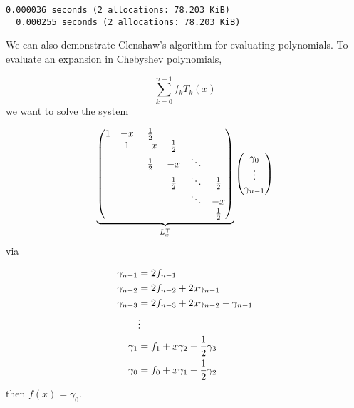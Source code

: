 \documentclass[12pt,a4paper]{article}
\def\half{ {1 \over 2} }
\begin{document}
\begin{lstlisting}
0.000036 seconds (2 allocations: 78.203 KiB)
  0.000255 seconds (2 allocations: 78.203 KiB)
\end{lstlisting}


We can also demonstrate Clenshaw's algorithm for evaluating polynomials. To evaluate an expansion in Chebyshev polynomials,

\[
\sum_{k = 0}^{n-1}f_kT_k(x)
\]
we want to solve the system

\[
\underbrace{\begin{pmatrix}
1 & -x & \half \\
& 1 & -x & \half  \\
& & \half & -x & \ddots  \\
& &     & \half & \ddots & \half \\
&&&&\ddots & -x \\
&&&&& \half
\end{pmatrix}}_{L_x^\top} \begin{pmatrix} \gamma_0 \\\vdots\\ \gamma_{n-1} \end{pmatrix}
\]
via


\begin{align*}
\gamma_{n-1} &= 2f_{n-1} \\
\gamma_{n-2} &= 2f_{n-2} + 2x \gamma_{n-1} \\
\gamma_{n-3} &= 2 f_{n-3} + 2x \gamma_{n-2} - \gamma_{n-1} \\
& \vdots \\
\gamma_1 &= f_1 + x \gamma_2 - \half \gamma_3 \\
\gamma_0 &= f_0 + x \gamma_1 - \half \gamma_2
\end{align*}
then $f(x) = \gamma_0$.
\end{document}

